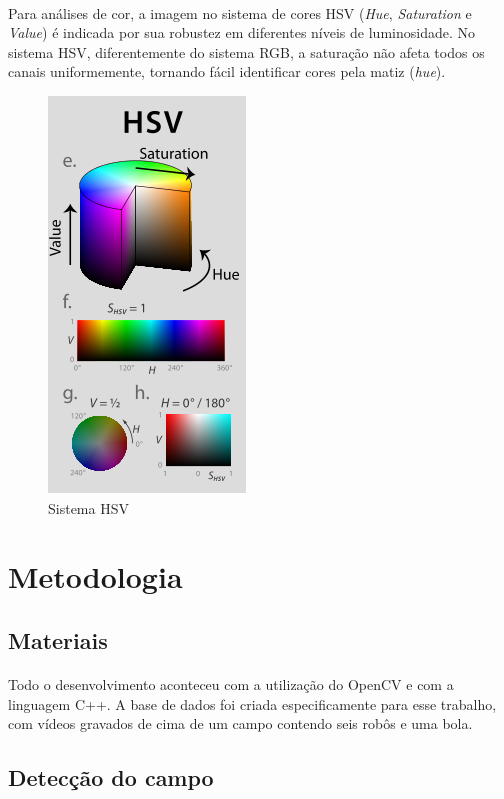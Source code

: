 \documentclass[conference, harvard, brazil, english]{sbatex}
\begin{document}
		\paragraph{}
		Para análises de cor, a imagem no sistema de cores HSV (\textit{Hue}, \textit{Saturation} e \textit{Value}) é indicada por sua robustez em diferentes níveis de luminosidade. No sistema HSV, diferentemente do sistema RGB, a saturação não afeta todos os canais uniformemente, tornando fácil identificar cores pela matiz (\textit{hue}).
		\begin{figure}[h]
			\centering
			\includegraphics[scale=0.63]{hsv-2}
			\caption{Sistema HSV}
		\end{figure}
	
	\section{Metodologia}
		\subsection{Materiais}
		\paragraph{}
		Todo o desenvolvimento aconteceu com a utilização do OpenCV e com a linguagem C++. A base de dados foi criada especificamente para esse trabalho, com vídeos gravados de cima de um campo contendo seis robôs e uma bola. 
		\subsection{Detecção do campo}
\end{document}
